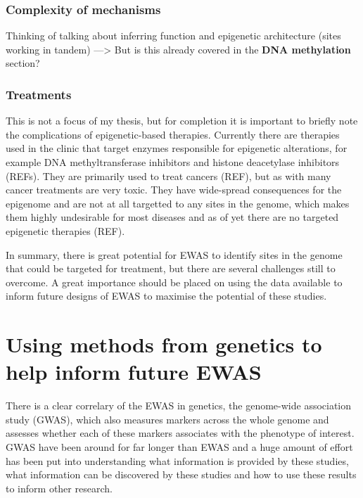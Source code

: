 \documentclass[11pt,twoside]{bristolthesis}
\begin{document}
\hypertarget{complexity-of-mechanisms}{%
\subsubsection{Complexity of mechanisms}\label{complexity-of-mechanisms}}

Thinking of talking about inferring function and epigenetic architecture (sites working in tandem) ---\textgreater{} But is this already covered in the \textbf{DNA methylation} section?

\hypertarget{treatments}{%
\subsubsection{Treatments}\label{treatments}}

This is not a focus of my thesis, but for completion it is important to briefly note the complications of epigenetic-based therapies. Currently there are therapies used in the clinic that target enzymes responsible for epigenetic alterations, for example DNA methyltransferase inhibitors and histone deacetylase inhibitors (REFs). They are primarily used to treat cancers (REF), but as with many cancer treatments are very toxic. They have wide-spread consequences for the epigenome and are not at all targetted to any sites in the genome, which makes them highly undesirable for most diseases and as of yet there are no targeted epigenetic therapies (REF).

In summary, there is great potential for EWAS to identify sites in the genome that could be targeted for treatment, but there are several challenges still to overcome. A great importance should be placed on using the data available to inform future designs of EWAS to maximise the potential of these studies.

\hypertarget{genetics-in-ewas}{%
\section{Using methods from genetics to help inform future EWAS}\label{genetics-in-ewas}}

There is a clear correlary of the EWAS in genetics, the genome-wide association study (GWAS), which also measures markers across the whole genome and assesses whether each of these markers associates with the phenotype of interest. GWAS have been around for far longer than EWAS and a huge amount of effort has been put into understanding what information is provided by these studies, what information can be discovered by these studies and how to use these results to inform other research.
\end{document}
